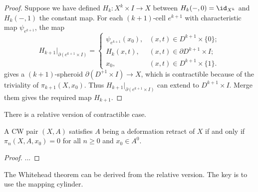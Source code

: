 \begin{proof}
        Suppose we have defined $H_k:X^k\times I\to X$ between 
        $H_k(-,0) = \id_{X^k}$ and $H_k(-,1)$ the constant map. 
        For each $(k+1)$-cell $e^{k+1}$ with characteristic map 
        $\psi_{e^{k+1}}$, the map 
        \begin{equation*}
            H_{k+1}\big|_{\partial(e^{k+1}\times I)} = 
            \begin{cases}
                \psi_{e^{k+1}}(x_0),&(x,t)\in D^{k+1}\times\{0\};\\
                H_k(x,t),&(x,t)\in\partial D^{k+1}\times I;\\
                x_0,&(x,t)\in D^{k+1}\times\{1\}.
            \end{cases}
        \end{equation*}
        gives a $(k+1)$-spheroid $\partial(D^{+1}\times I)\to X$, 
        which is contractible because of the triviality of 
        $\pi_{k+1}(X,x_0)$. Thus $H_{k+1}\big|_{\partial(e^{k+1}\times I)}$ 
        can extend to $D^{k+1}\times I$. Merge them gives the required map 
        $H_{k+1}$.  
    \end{proof}

    There is a relative version of contractible case. 

    \begin{theorem}{\label{thm:relative-Whitehead-theorem}}
        A CW pair $(X,A)$ satisfies $A$ being a deformation retract of $X$ 
        if and only if $\pi_n(X,A,x_0) = 0$ for all $n\geq 0$ and 
        $x_0\in A^0$.
    \end{theorem}
    \begin{proof}
        ...
    \end{proof}

    The Whitehead theorem can be derived from the relative version. 
    The key is to use the mapping cylinder.